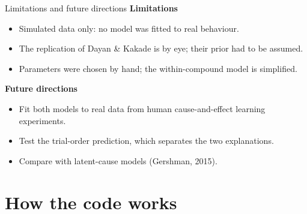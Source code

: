 \documentclass[aspectratio=169,11pt]{beamer}
\begin{document}
\begin{frame}{Limitations and future directions}
\textbf{Limitations}
\begin{itemize}\small
\item Simulated data only: no model was fitted to real behaviour.
\item The replication of Dayan \& Kakade is by eye; their prior had to be assumed.
\item Parameters were chosen by hand; the within-compound model is simplified.
\end{itemize}
\textbf{Future directions}
\begin{itemize}\small
\item Fit both models to real data from human cause-and-effect learning experiments.
\item Test the trial-order prediction, which separates the two explanations.
\item Compare with latent-cause models (Gershman, 2015).
\end{itemize}
\end{frame}

\section{How the code works}
\end{document}
